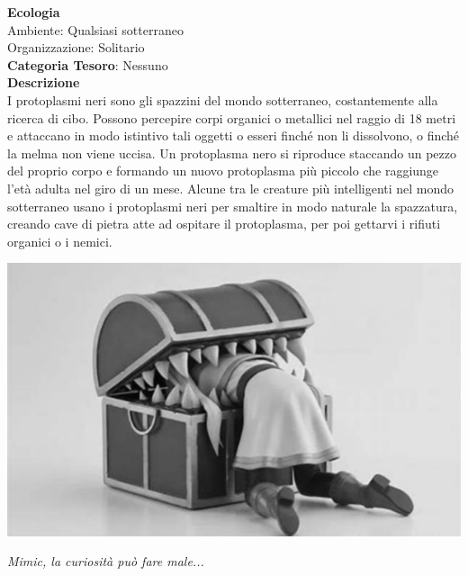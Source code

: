 \begin{multicols}{2}
{\textbf{Ecologia}\\
Ambiente: Qualsiasi sotterraneo\\
Organizzazione: Solitario\\
\textbf{Categoria Tesoro}: Nessuno\\
\textbf{Descrizione}\\
I protoplasmi neri sono gli spazzini del mondo sotterraneo, costantemente alla ricerca di cibo. Possono percepire corpi organici o metallici nel raggio di 18 metri e attaccano in modo istintivo tali oggetti o esseri finché non li dissolvono, o finché la melma non viene uccisa. Un protoplasma nero si riproduce staccando un pezzo del proprio corpo e formando un nuovo protoplasma più piccolo che raggiunge l'età adulta nel giro di un mese. Alcune tra le creature più intelligenti nel mondo sotterraneo usano i protoplasmi neri per smaltire in modo naturale la spazzatura, creando cave di pietra atte ad ospitare il protoplasma, per poi gettarvi i rifiuti organici o i nemici.


\medskip

\begin{center}
	\includegraphics[width=0.9\linewidth]{immagini/mimic_grayscale.png}

	\emph{Mimic, la curiosità può fare male...}
\end{center}



}
\end{multicols}
